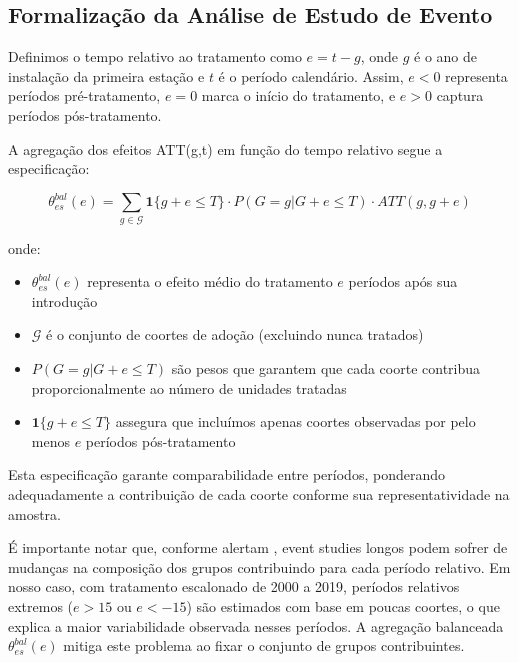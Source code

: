 \documentclass[
	12pt,				%
	oneside,			%
	a4paper,			%
	english,			%
	french,				%
	spanish,			%
	brazil				%
	]{abntex2}
\begin{document}
\subsection{Formalização da Análise de Estudo de Evento}

Definimos o tempo relativo ao tratamento como $e = t - g$, onde $g$ é o ano de instalação da primeira estação e $t$ é o período calendário. Assim, $e < 0$ representa períodos pré-tratamento, $e = 0$ marca o início do tratamento, e $e > 0$ captura períodos pós-tratamento.

A agregação dos efeitos ATT(g,t) em função do tempo relativo segue a especificação:

\begin{equation}
\theta_{es}^{bal}(e) = \sum_{g \in \mathcal{G}} \mathbf{1}\{g + e \leq T\} \cdot P(G = g | G + e \leq T) \cdot ATT(g, g+e)
\end{equation}

onde:
\begin{itemize}
\item $\theta_{es}^{bal}(e)$ representa o efeito médio do tratamento $e$ períodos após sua introdução
\item $\mathcal{G}$ é o conjunto de coortes de adoção (excluindo nunca tratados)
\item $P(G = g | G + e \leq T)$ são pesos que garantem que cada coorte contribua proporcionalmente ao número de unidades tratadas
\item $\mathbf{1}\{g + e \leq T\}$ assegura que incluímos apenas coortes observadas por pelo menos $e$ períodos pós-tratamento
\end{itemize}

Esta especificação garante comparabilidade entre períodos, ponderando adequadamente a contribuição de cada coorte conforme sua representatividade na amostra.

É importante notar que, conforme alertam , event studies longos podem sofrer de mudanças na composição dos grupos contribuindo para cada período relativo. Em nosso caso, com tratamento escalonado de 2000 a 2019, períodos relativos extremos ($e > 15$ ou $e < -15$) são estimados com base em poucas coortes, o que explica a maior variabilidade observada nesses períodos. A agregação balanceada $\theta_{es}^{bal}(e)$ mitiga este problema ao fixar o conjunto de grupos contribuintes.

\end{document}
